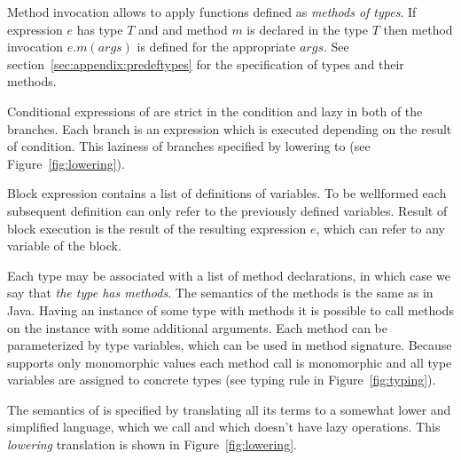 Method invocation allows to apply functions defined as \emph{methods of types}. If
expression $e$ has type $T$ and and method $m$ is declared in the type $T$ then method
invocation $e.m(args)$ is defined for the appropriate $args$. See
section~\ref{sec:appendix:predeftypes} for the specification of types and their
methods.

Conditional expressions of \langname are strict in the condition and lazy in both
of the branches. Each branch is an expression which is executed depending on
the result of condition. This laziness of branches specified by lowering to
\corelang (see Figure~\ref{fig:lowering}).

Block expression contains a list of  definitions of variables. To be
wellformed each subsequent definition can only refer to the previously defined
variables. Result of block execution is the result of the resulting
expression $e$, which can refer to any variable of the block.

Each type may be associated with a list of method declarations, in which case
we say that \emph{the type has methods}. The semantics of the methods is the
same as in Java. Having an instance of some type with methods it is possible
to call methods on the instance with some additional arguments.
Each method can be parameterized by type variables, which
can be used in method signature. Because \langname supports only monomorphic
values each method call is monomorphic and all type variables are assigned to
concrete types (see  typing rule in Figure~\ref{fig:typing}).

The semantics of \langname is specified by translating all its terms to a somewhat
lower and simplified language, which we call \corelang and which doesn't have lazy
operations. This \emph{lowering} translation is shown in Figure~\ref{fig:lowering}.

